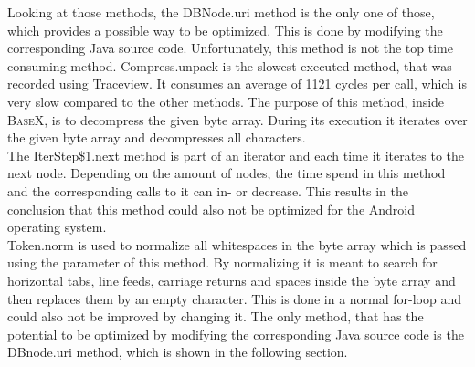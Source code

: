 Looking at those methods, the \textsf{DBNode.uri} method is the only one of those, which provides a possible way to be optimized.
This is done by modifying the corresponding Java source code.
Unfortunately, this method is not the top time consuming method.
\textsf{Compress.unpack} is the slowest executed method, that was recorded using Traceview.
It consumes an average of 1121 cycles per call, which is very slow compared to the other methods.
The purpose of this method, inside \textsc{BaseX}, is to decompress the given byte array.
During its execution it iterates over the given byte array and decompresses all characters.
\\
The \textsf{IterStep\$1.next} method is part of an iterator and each time it iterates to the next node.
Depending on the amount of nodes, the time spend in this method and the corresponding calls to it can in- or decrease.
This results in the conclusion that this method could also not be optimized for the Android operating system.
\\
\textsf{Token.norm} is used to normalize all whitespaces in the byte array which is passed using the parameter of this method.
By normalizing it is meant to search for horizontal tabs, line feeds, carriage returns and spaces inside the byte array and then replaces them by an empty character.
This is done in a normal for-loop and could also not be improved by changing it.
The only method, that has the potential to be optimized by modifying the corresponding Java source code is the \textsf{DBnode.uri} method, which is shown in the following section.


